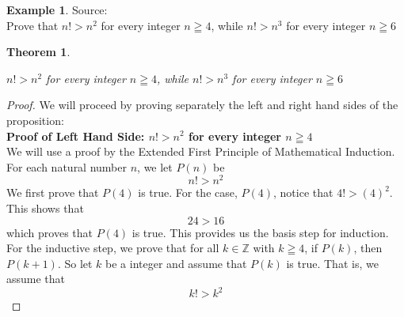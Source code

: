 \documentclass{book}
\newtheorem{theorem}{Theorem}[section]
\theoremstyle{definition}
\newtheorem{example}{Example}[definition]
\theoremstyle{remark}
\newcommand{\bb}[1]{\mathbb{#1}}
\begin{document}
\newpage
\begin{example}
Source: \cite[Chap.1, S.1.1, Prob.1.1, Q.3]{david} \\ 

Prove that $n! > n^2$ for every integer $n \geqq 4$, while $n! > n^3$ for every integer $n \geqq 6$ 
\begin{tcolorbox}
    \begin{theorem}
        \begin{center}
            $n! > n^2$ for every integer $n \geqq 4$, while $n! > n^3$ for every integer $n \geqq 6$                
        \end{center}
    \end{theorem}
\end{tcolorbox}

\begin{proof}
    We will proceed by proving separately the left and right hand sides of the proposition: \\
    
    \textbf{Proof of Left Hand Side: $n! > n^2$ for every integer $n \geqq 4$} \\
            We will use a proof by the Extended First Principle of Mathematical Induction. For each natural number $n$, we let $P(n)$ be
                \begin{equation*}
                    n! > n^2
                \end{equation*}
            We first prove that $P(4)$ is true. For the case, $P(4)$, notice that $4! > (4)^2$. This shows that   
                \begin{equation*}
                     24 > 16
                \end{equation*}
            which proves that $P(4)$ is true. This provides us the basis step for induction. \\ 
            
            For the inductive step, we prove that for all $k \in \bb{Z}$ with $k \geqq 4$, if $P(k)$, then $P(k+1)$. So let $k$ be a integer and assume that $P(k)$ is true. That is, we assume that 
                \begin{equation*}
                   k! > k^2
                \end{equation*}
            

\end{proof}
\end{example}
\end{document}
